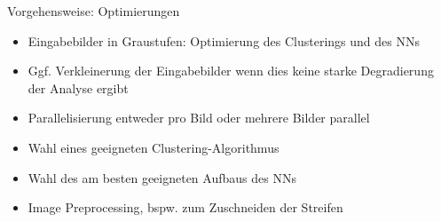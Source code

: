 \documentclass[9pt]{beamer}
\begin{document}
\begin{frame}{Vorgehensweise: Optimierungen}
	\begin{itemize}
		\item Eingabebilder in Graustufen: Optimierung des Clusterings und des NNs
		\item Ggf. Verkleinerung der Eingabebilder wenn dies keine starke Degradierung der Analyse ergibt
		\item Parallelisierung entweder pro Bild oder mehrere Bilder parallel
		\item Wahl eines geeigneten Clustering-Algorithmus
		\item Wahl des am besten geeigneten Aufbaus des NNs
		\item Image Preprocessing, bspw. zum Zuschneiden der Streifen
	\end{itemize}
\end{frame}
\end{document}
